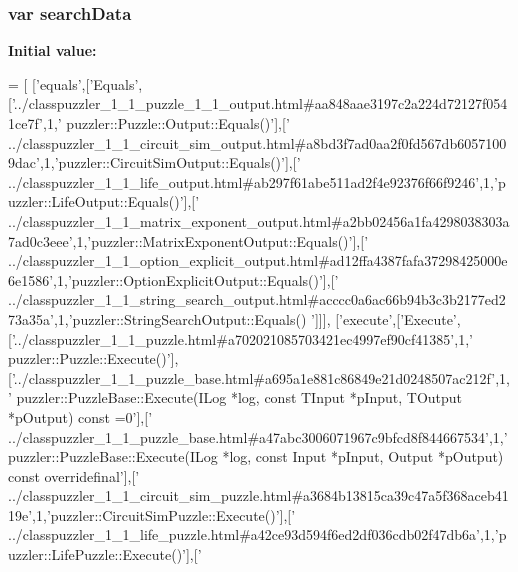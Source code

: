 \subsubsection[{search\+Data}]{\setlength{\rightskip}{0pt plus 5cm}var search\+Data}\label{a00049_ad01a7523f103d6242ef9b0451861231e}
{\bfseries Initial value\+:}
\begin{DoxyCode}
=
[
  [\textcolor{stringliteral}{'equals'},[\textcolor{stringliteral}{'Equals'},[\textcolor{stringliteral}{'../classpuzzler\_1\_1\_puzzle\_1\_1\_output.html#aa848aae3197c2a224d72127f0541ce7f'},1,\textcolor{stringliteral}{'
      puzzler::Puzzle::Output::Equals()'}],[\textcolor{stringliteral}{'
      ../classpuzzler\_1\_1\_circuit\_sim\_output.html#a8bd3f7ad0aa2f0fd567db60571009dac'},1,\textcolor{stringliteral}{'puzzler::CircuitSimOutput::Equals()'}],[\textcolor{stringliteral}{'
      ../classpuzzler\_1\_1\_life\_output.html#ab297f61abe511ad2f4e92376f66f9246'},1,\textcolor{stringliteral}{'puzzler::LifeOutput::Equals()'}],[\textcolor{stringliteral}{'
      ../classpuzzler\_1\_1\_matrix\_exponent\_output.html#a2bb02456a1fa4298038303a7ad0c3eee'},1,\textcolor{stringliteral}{'puzzler::MatrixExponentOutput::Equals()'}],[\textcolor{stringliteral}{'
      ../classpuzzler\_1\_1\_option\_explicit\_output.html#ad12ffa4387fafa37298425000e6e1586'},1,\textcolor{stringliteral}{'puzzler::OptionExplicitOutput::Equals()'}],[\textcolor{stringliteral}{'
      ../classpuzzler\_1\_1\_string\_search\_output.html#acccc0a6ac66b94b3c3b2177ed273a35a'},1,\textcolor{stringliteral}{'puzzler::StringSearchOutput::Equals()
      '}]]],
  [\textcolor{stringliteral}{'execute'},[\textcolor{stringliteral}{'Execute'},[\textcolor{stringliteral}{'../classpuzzler\_1\_1\_puzzle.html#a702021085703421ec4997ef90cf41385'},1,\textcolor{stringliteral}{'
      puzzler::Puzzle::Execute()'}],[\textcolor{stringliteral}{'../classpuzzler\_1\_1\_puzzle\_base.html#a695a1e881c86849e21d0248507ac212f'},1,\textcolor{stringliteral}{'
      puzzler::PuzzleBase::Execute(ILog *log, const TInput *pInput, TOutput *pOutput) const =0'}],[\textcolor{stringliteral}{'
      ../classpuzzler\_1\_1\_puzzle\_base.html#a47abc3006071967c9bfcd8f844667534'},1,\textcolor{stringliteral}{'puzzler::PuzzleBase::Execute(ILog *log, const Input *pInput,
       Output *pOutput) const overridefinal'}],[\textcolor{stringliteral}{'
      ../classpuzzler\_1\_1\_circuit\_sim\_puzzle.html#a3684b13815ca39c47a5f368aceb4119e'},1,\textcolor{stringliteral}{'puzzler::CircuitSimPuzzle::Execute()'}],[\textcolor{stringliteral}{'
      ../classpuzzler\_1\_1\_life\_puzzle.html#a42ce93d594f6ed2df036cdb02f47db6a'},1,\textcolor{stringliteral}{'puzzler::LifePuzzle::Execute()'}],[\textcolor{stringliteral}{'
}
\end{DoxyCode}
